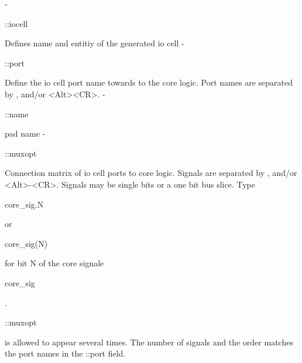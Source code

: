 \documentclass[a4paper,12pt]{article}
\begin{document}
\hspace*{4mm}-\hspace*{4mm}\begin{tt}::iocell\end{tt}\hspace*{3mm}Defines name and entitiy of the generated io cell\newline
\hspace*{4mm}-\hspace*{4mm}\begin{tt}::port\end{tt}\hspace*{7mm}Define the io cell port name towards to the core logic. Port\newline
\hspace*{32mm} names are separated by , and/or <Alt><CR>.\newline
\hspace*{4mm}-\hspace*{4mm}\begin{tt}::name\end{tt}\hspace*{8mm}pad name\newline
\hspace*{4mm}-\hspace*{4mm}\begin{tt}::muxopt\end{tt}\hspace*{4mm}Connection matrix of io cell ports to core logic. Signals are separated\newline
\hspace*{33mm}by , and/or <Alt>-<CR>. Signals may be single bits or a one bit bus\newline
\hspace*{33mm}slice. Type \begin{tt}core\_sig.N\end{tt} or \begin{tt}core\_sig(N)\end{tt} for bit N of the core signale\newline
\hspace*{33mm}\begin{tt}core\_sig\end{tt}.\begin{tt}::muxopt\end{tt} is allowed to appear several times. The number of\newline
\hspace*{33mm}signals and the order matches the port names in the ::port field.\newline
\end{document}
